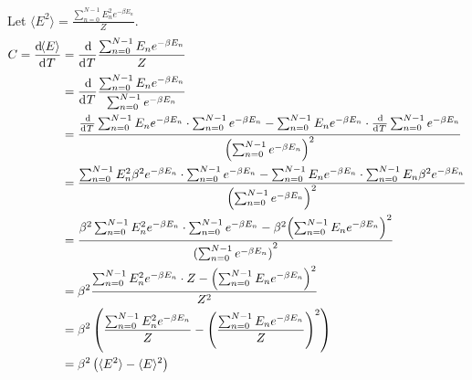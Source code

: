 \documentclass{article}
\begin{document}
\clearpage

\problem
Let $\langle E^2 \rangle = \frac{\sum_{n=0}^{N-1} E_n^2e^{-\beta E_n}}{Z}$.
\begin{equation}
    \begin{split}
        C = \deriv[]{\langle E \rangle}{T} & = \deriv[]{}{T} \frac{\sum_{n=0}^{N-1} E_n e^{-\beta E_n}}{Z} \\
        & = \deriv[]{}{T} \frac{\sum_{n=0}^{N-1} E_n e^{-\beta E_n}}{\sum_{n=0}^{N-1} e^{-\beta E_n}} \\
        & = \frac{\deriv[]{}{T}\sum_{n=0}^{N-1} E_n e^{-\beta E_n} \cdot \sum_{n=0}^{N-1} e^{-\beta E_n} - \sum_{n=0}^{N-1} E_n e^{-\beta E_n} \cdot \deriv[]{}{T}\sum_{n=0}^{N-1} e^{-\beta E_n}}{{\left(\sum_{n=0}^{N-1} e^{-\beta E_n}\right)}^2} \\
        & = \frac{\sum_{n=0}^{N-1} E_n^2\beta^2e^{-\beta E_n} \cdot \sum_{n=0}^{N-1} e^{-\beta E_n} - \sum_{n=0}^{N-1} E_n e^{-\beta E_n} \cdot \sum_{n=0}^{N-1} E_n\beta^2e^{-\beta E_n}}{{\left(\sum_{n=0}^{N-1} e^{-\beta E_n}\right)}^2} \\
        & = \frac{\beta^2\sum_{n=0}^{N-1} E_n^2e^{-\beta E_n} \cdot \sum_{n=0}^{N-1} e^{-\beta E_n} - \beta^2{\left(\sum_{n=0}^{N-1} E_n e^{-\beta E_n}\right)}^2}{{(\sum_{n=0}^{N-1} e^{-\beta E_n})}^2} \\
        & = \beta^2\frac{\sum_{n=0}^{N-1} E_n^2e^{-\beta E_n} \cdot Z - {\left(\sum_{n=0}^{N-1} E_n e^{-\beta E_n}\right)}^2}{Z^2} \\
        & = \beta^2\left(\frac{\sum_{n=0}^{N-1} E_n^2e^{-\beta E_n}}{Z} - {\left(\frac{\sum_{n=0}^{N-1} E_n e^{-\beta E_n}}{Z}\right)}^2\right) \\
        & = \beta^2\left(\langle E^2 \rangle - \langle E \rangle^2\right)
    \end{split}
\end{equation}

\clearpage
\end{document}
